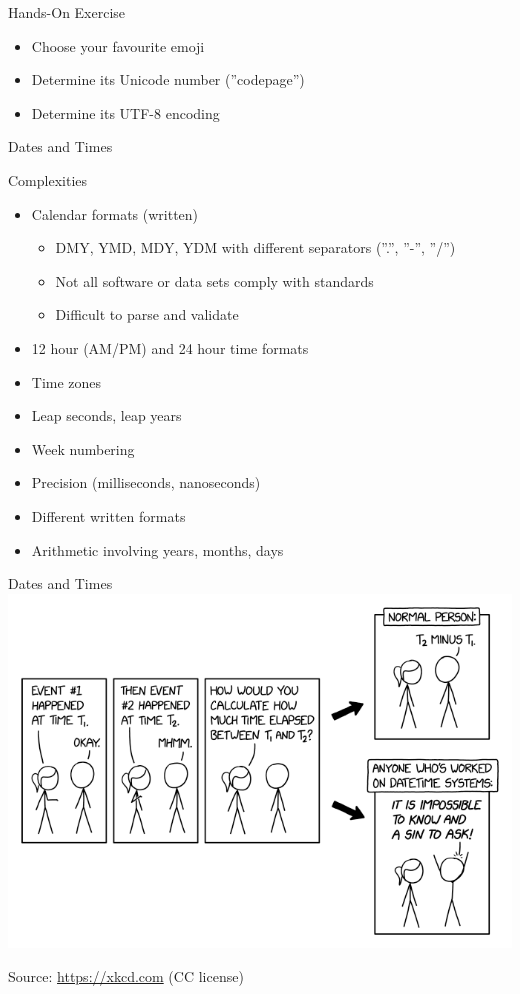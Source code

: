 \documentclass[ignorenonframetext,xcolor=x11names]{beamer}
\begin{document}
\begin{frame}{Hands-On Exercise}
\begin{itemize}
	\item Choose your favourite emoji
	\item Determine its Unicode number (''codepage'')
	\item Determine its UTF-8 encoding
\end{itemize}
\end{frame}

\begin{frame}{Dates and Times}
\begin{block}{Complexities}
\begin{itemize}
   \item Calendar formats (written)
   \begin{itemize}
		\item DMY, YMD, MDY, YDM with different separators (''.'', ''-'', ''/'')
		\item Not all software or data sets comply with standards
		\item Difficult to parse and validate
	\end{itemize}
   \item 12 hour (AM/PM) and 24 hour time formats
   \item Time zones
   \item Leap seconds, leap years
   \item Week numbering
   \item Precision (milliseconds, nanoseconds)
   \item Different written formats
   \item Arithmetic involving years, months, days
\end{itemize}
\end{block}
\end{frame}

\begin{frame}{Dates and Times}
\centering
\includegraphics[width=\textwidth]{datetime.png} 

\scriptsize Source: \url{https://xkcd.com} (CC license)
\end{frame}
\end{document}
